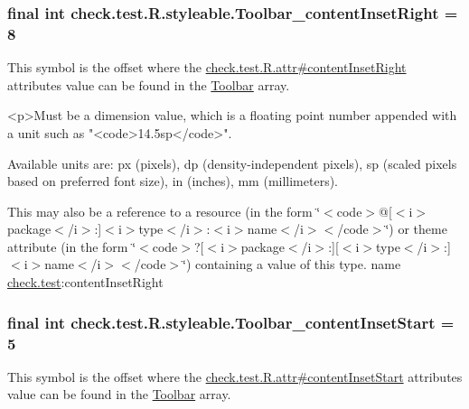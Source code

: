 \subsubsection[{Toolbar\+\_\+content\+Inset\+Right}]{\setlength{\rightskip}{0pt plus 5cm}final int check.\+test.\+R.\+styleable.\+Toolbar\+\_\+content\+Inset\+Right = 8\hspace{0.3cm}{\ttfamily [static]}}\label{classcheck_1_1test_1_1_r_1_1styleable_a03f33bda55e3dc7f0e54ed0c302c497e}
This symbol is the offset where the \hyperlink{classcheck_1_1test_1_1_r_1_1attr_a72fa272b4d22878eaf90ba1b801a2aa2}{check.\+test.\+R.\+attr\#content\+Inset\+Right} attribute\textquotesingle{}s value can be found in the \hyperlink{classcheck_1_1test_1_1_r_1_1styleable_a1a7fa90223693abef77e7484cca2df54}{Toolbar} array.

\begin{DoxyVerb}      <p>Must be a dimension value, which is a floating point number appended with a unit such as "<code>14.5sp</code>".
\end{DoxyVerb}
 Available units are\+: px (pixels), dp (density-\/independent pixels), sp (scaled pixels based on preferred font size), in (inches), mm (millimeters). 

This may also be a reference to a resource (in the form \char`\"{}$<$code$>$@\mbox{[}$<$i$>$package$<$/i$>$\+:\mbox{]}$<$i$>$type$<$/i$>$\+:$<$i$>$name$<$/i$>$$<$/code$>$\char`\"{}) or theme attribute (in the form \char`\"{}$<$code$>$?\mbox{[}$<$i$>$package$<$/i$>$\+:\mbox{]}\mbox{[}$<$i$>$type$<$/i$>$\+:\mbox{]}$<$i$>$name$<$/i$>$$<$/code$>$\char`\"{}) containing a value of this type.  name \hyperlink{namespacecheck_1_1test}{check.\+test}\+:content\+Inset\+Right \hypertarget{classcheck_1_1test_1_1_r_1_1styleable_a9dae7a4f6dfee5c810df77ff15242164}{}
\subsubsection[{Toolbar\+\_\+content\+Inset\+Start}]{\setlength{\rightskip}{0pt plus 5cm}final int check.\+test.\+R.\+styleable.\+Toolbar\+\_\+content\+Inset\+Start = 5\hspace{0.3cm}{\ttfamily [static]}}\label{classcheck_1_1test_1_1_r_1_1styleable_a9dae7a4f6dfee5c810df77ff15242164}
This symbol is the offset where the \hyperlink{classcheck_1_1test_1_1_r_1_1attr_aff1a02632be3b62d04d2aff4c7f17b43}{check.\+test.\+R.\+attr\#content\+Inset\+Start} attribute\textquotesingle{}s value can be found in the \hyperlink{classcheck_1_1test_1_1_r_1_1styleable_a1a7fa90223693abef77e7484cca2df54}{Toolbar} array.

